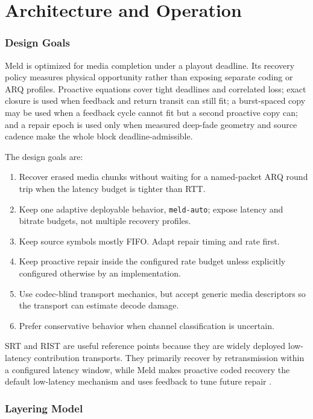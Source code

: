\documentclass[11pt]{article}
\newcommand{\meld}{Meld}
\newcommand{\code}[1]{\ifmmode\text{\texttt{#1}}\else\texttt{#1}\fi}
\begin{document}
\clearpage
\part{Architecture and Operation}

\section{Design Goals}

\meld{} is optimized for media completion under a playout deadline. Its recovery
policy measures physical opportunity rather than exposing separate coding or ARQ
profiles. Proactive equations cover tight deadlines and correlated loss; exact
closure is used when feedback and return transit can still fit; a burst-spaced
copy may be used when a feedback cycle cannot fit but a second proactive copy can;
and a repair epoch is used only when measured deep-fade geometry
and source cadence make the whole block deadline-admissible.

The design goals are:

\begin{enumerate}
\item Recover erased media chunks without waiting for a named-packet ARQ round
      trip when the latency budget is tighter than RTT.
\item Keep one adaptive deployable behavior, \code{meld-auto}; expose latency and
      bitrate budgets, not multiple recovery profiles.
\item Keep source symbols mostly FIFO. Adapt repair timing and rate first.
\item Keep proactive repair inside the configured rate budget unless explicitly
      configured otherwise by an implementation.
\item Use codec-blind transport mechanics, but accept generic media descriptors
      so the transport can estimate decode damage.
\item Prefer conservative behavior when channel classification is uncertain.
\end{enumerate}

SRT and RIST are useful reference points because they are widely deployed
low-latency contribution transports. They primarily recover by retransmission
within a configured latency window, while Meld makes proactive coded recovery the
default low-latency mechanism and uses feedback to tune future repair
\cite{srt-rfc,rist-tr061,rist-tr062}.

\section{Layering Model}
\label{sec:layering}
\end{document}

